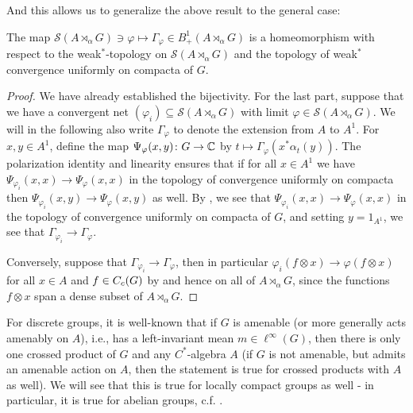 And this allows us to generalize the above result to the general case:
\begin{proposition}
	The map $\mathcal{S}(A \rtimes_\alpha G) \ni \varphi \mapsto \Gamma_\varphi \in B_+^1(A \rtimes_\alpha G)$ is a homeomorphism with respect to the weak$^*$-topology on $\mathcal{S}(A \rtimes_\alpha G)$ and the topology of weak$^*$ convergence uniformly on compacta of $G$.	
\end{proposition}
\begin{proof}
	We have already established the bijectivity. For the last part, suppose that we have a convergent net $(\varphi_i) \subseteq \mathcal{S}(A \rtimes _\alpha  G)$	with limit $\varphi \in \mathcal{S}(A \rtimes_\alpha G)$. We will in the following also write $\Gamma_\varphi$ to denote the extension from $A$ to $A^1$. For $x,y \in A^1$, define the map $\Psi_{\varphi}(x,y) \colon G \to \mathbb{C}$ by $t \mapsto \Gamma_\varphi(x^* \alpha_t(y))$. The polarization identity and linearity ensures that if for all $x \in A^1$ we have $\Psi_{\varphi_i}(x,x) \to \Psi_{\varphi}(x,x)$ in the topology of convergence uniformly on compacta then $\Psi_{\varphi_i}(x,y) \to \Psi_{\varphi}(x,y)$ as well. By , we see that $\Psi_{\varphi_i}(x,x) \to \Psi_{\varphi}(x,x)$ in the topology of convergence uniformly on compacta of $G$, and setting $y = 1_{A^1}$, we see that $\Gamma_{\varphi_i} \to \Gamma_\varphi$.

	Conversely, suppose that $\Gamma_{\varphi_i} \to \Gamma_{\varphi}$, then in particular $\varphi_{i}(f \otimes x) \to \varphi(f \otimes x)$ for all $x \in A$ and $f \in C_c(G)$ by  and hence on all of $A \rtimes_\alpha G$, since the functions $f \otimes x$ span a dense subset of $A \rtimes_\alpha G$.
\end{proof}

For discrete groups, it is well-known  that if $G$ is amenable (or more generally acts amenably on $A$), i.e., has a left-invariant mean $m \in \ell^\infty(G)$, then there is only one crossed product of $G$ and any $C^*$-algebra $A$ (if $G$ is not amenable, but admits an amenable action on $A$, then the statement is true for crossed products with $A$ as well). We will see that this is true for locally compact groups as well - in particular, it is true for abelian groups, c.f. \cite[appendix G]{bekka2008kazhdan}.

